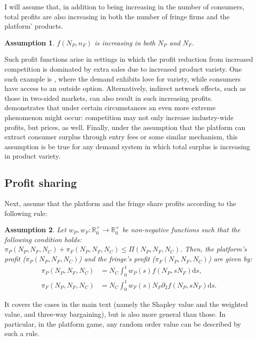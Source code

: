 \documentclass[a4paper]{article}
\newtheorem{assumption}{Assumption}
\newcommand{\ds}{\mathrm{d}s}
\begin{document}
I will assume that, in addition to being increasing in the number of consumers, total profits are also increasing in both the number of fringe firms and the platform' products.
\begin{assumption}
    \label{ass:monotone_profits}
    $f(N_P, n_F)$ is increasing in both $N_P$ and $N_F$.
\end{assumption}
Such profit functions arise in settings in which the profit reduction from increased competition is dominated by extra sales due to increased product variety.
One such example is \textcite{anderson2020aggregative}, where the demand exhibits love for variety, while consumers have access to an outside option.
Alternatively, indirect network effects, such as those in two-sided markets, can also result in such increasing profits.
\textcite{chen2008price} demonstrates that under certain circumstances an even more extreme phenomenon might occur: competition may not only increase industry-wide profits, but prices, as well.
Finally, under the assumption that the platform can extract consumer surplus through entry fees or some similar mechanism, this assumption is be true for any demand system in which total surplus is increasing in product variety.

\subsection{Profit sharing}
\label{sec:more_general_profit_sharing}
Next, assume that the platform and the fringe share profits according to the following rule:
\begin{assumption}
    \label{ass:profit_sharing}
    Let $w_P, w_F: \mathbb{R}^+_0 \to \mathbb{R}^+_0$ be non-negative functions such that the following condition holds: $\pi_P(N_P, N_F, N_C) + \pi_F(N_P, N_F, N_C) \leq \Pi(N_P, N_F, N_C)$.
    Then, the platform's profit ($\pi_P(N_P, N_F, N_C)$) and the fringe's profit ($\pi_F(N_P, N_F, N_C)$) are given by:
    \begin{align*}
        \pi_P(N_P, N_F, N_C) &= N_C \int_0^1 w_P(s) f(N_P, s N_F) \ds, \\
        \pi_F(N_P, N_F, N_C) &= N_C \int_0^1 w_F(s) N_F \partial_2 f(N_P, s N_F) \ds.
    \end{align*}
\end{assumption}
It covers the cases in the main text (namely the Shapley value and the weighted value, and three-way bargaining), but is also more general than those.
In particular, in the platform game, any random order value \parencite{weber1988probabilistic} can be described by such a rule.
\end{document}
